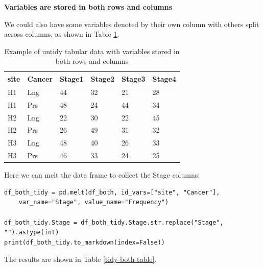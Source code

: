 \bigskip

\textbf{Variables are stored in both rows and columns}

We could also have some variables denoted by their own column with others split across columns, as shown in Table \ref{untidy-both-table}.

\bigskip\noindent
\begin{table}[!htbp]
\centering
\begin{tabular}{p{}p{}p{}p{}p{}p{}}
\toprule
site & Cancer & Stage1 & Stage2 & Stage3 & Stage4 \\
\hline
H1 & Lng & 44 & 32 & 21 & 28 \\
H1 & Prs & 48 & 24 & 44 & 34 \\
H2 & Lng & 22 & 30 & 22 & 45 \\
H2 & Prs & 26 & 49 & 31 & 32 \\
H3 & Lng & 48 & 40 & 26 & 33 \\
H3 & Prs & 46 & 33 & 24 & 25 \\
\bottomrule
\end{tabular}
\caption{Example of untidy tabular data with variables stored in both rows and columns}
\label{untidy-both-table}
\end{table}

\bigskip

Here we can melt the data frame to collect the Stage columns:

\begin{lstlisting}[style=Python]
df_both_tidy = pd.melt(df_both, id_vars=["site", "Cancer"], 
    var_name="Stage", value_name="Frequency")

df_both_tidy.Stage = df_both_tidy.Stage.str.replace("Stage", "").astype(int)
print(df_both_tidy.to_markdown(index=False))
\end{lstlisting}

The results are shown in Table \ref{tidy-both-table}.

